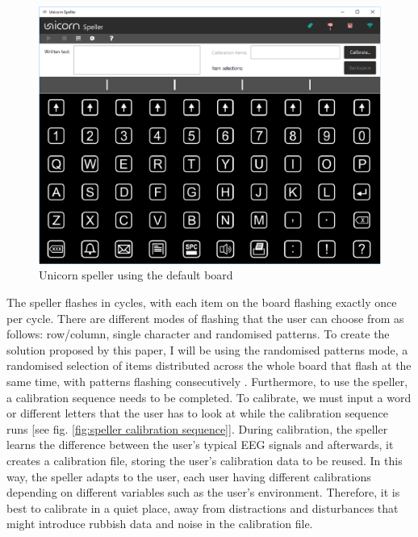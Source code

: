 \begin{figure}[H]
  \centering
  \includegraphics[width=1\textwidth]{Graphics/Speller.png}
  \caption{Unicorn speller using the default board}
  \label{fig:speller default board}
\end{figure}

The speller flashes in cycles, with each item on the board flashing exactly once per cycle. There are different modes of flashing that the user can choose from as follows: row/column, single character and randomised patterns. To create the solution proposed by this paper, I will be using the randomised patterns mode, a randomised selection of items distributed across the whole board that flash at the same time, with patterns flashing consecutively \cite{UnicornSuite_Manual}. 
\vspace{\baselineskip}\newline
Furthermore, to use the speller, a calibration sequence needs to be completed. To calibrate, we must input a word or different letters that the user has to look at while the calibration sequence runs [see fig. \ref{fig:speller calibration sequence}]. During calibration, the speller learns the difference between the user's typical EEG signals and afterwards, it creates a calibration file, storing the user's calibration data to be reused. In this way, the speller adapts to the user, each user having different calibrations depending on different variables such as the user's environment. Therefore, it is best to calibrate in a quiet place, away from distractions and disturbances that might introduce rubbish data and noise in the calibration file.

